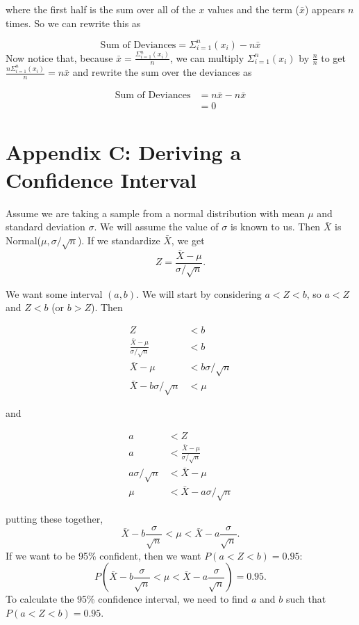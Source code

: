 \documentclass[
]{book}
\begin{document}
where the first half is the sum over all of the \(x\) values and the term (\(\bar{x}\)) appears \(n\) times. So we can rewrite this as

\[
\text{Sum of Deviances} = \Sigma_{i=1}^n (x_i) - n\bar{x}
\]
Now notice that, because \(\bar{x} = \frac{\Sigma_{i=1}^n (x_i)}{n}\), we can multiply \(\Sigma_{i=1}^n (x_i)\) by \(\frac{n}{n}\) to get \(\frac{n\Sigma_{i=1}^n (x_i)}{n} = n\bar{x}\) and rewrite the sum over the deviances as

\begin{align}
\text{Sum of Deviances} &= n\bar{x} - n\bar{x} \\ &=0
\end{align}

\section*{Appendix C: Deriving a Confidence Interval}\label{appendix-c-deriving-a-confidence-interval}

Assume we are taking a sample from a normal distribution with mean \(\mu\) and standard deviation \(\sigma\). We will assume the value of \(\sigma\) is known to us. Then \(\bar{X}\) is Normal(\(\mu, \sigma/\sqrt{n}\)). If we standardize \(\bar{X}\), we get \[Z = \frac{\bar{X}-\mu}{\sigma/\sqrt{n}}.\]

We want some interval \((a,b)\). We will start by considering \(a < Z < b\), so \(a < Z\) and \(Z < b\) (or \(b > Z\)). Then

\[
\begin{aligned}
Z &< b\\
\frac{\bar{X}-\mu}{\sigma/\sqrt{n}} &< b\\
\bar{X}-\mu &< b\sigma/\sqrt{n} \\
\bar{X}-b\sigma/\sqrt{n} &< \mu 
\end{aligned}
\]

and

\[
\begin{aligned}
a &< Z  \\
a &< \frac{\bar{X}-\mu}{\sigma/\sqrt{n}} \\
a\sigma/\sqrt{n} &< \bar{X}-\mu \\
\mu &< \bar{X}-a\sigma/\sqrt{n}
\end{aligned}
\]

putting these together, \[ \bar{X}-b\frac{\sigma}{\sqrt{n}} < \mu <  \bar{X}-a\frac{\sigma}{\sqrt{n}}.\] If we want to be 95\% confident, then we want \(P(a < Z < b)=0.95\): \[P\left(\bar{X}-b\frac{\sigma}{\sqrt{n}} < \mu <  \bar{X}-a\frac{\sigma}{\sqrt{n}}\right) = 0.95.\] To calculate the 95\% confidence interval, we need to find \(a\) and \(b\) such that \(P(a < Z < b)=0.95\).
\end{document}
